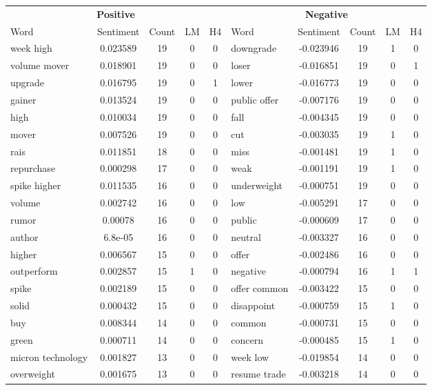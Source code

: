 \documentclass[ oneside,%
                    author={Joshua Felmeden},
                    degree={MEng},
                     title={Sentiment Analysis of Financial Headlines Based on Stock Returns},
                  subtitle={Research}]{dissertation}
\begin{document}
\begin{table}[!ht]
\centering
\begin{tabular}{lcccclcccc}
\multicolumn{5}{c}{\textbf{Positive}} & \multicolumn{5}{c}{\textbf{Negative}} \\
\cmidrule(lr){1-5}
\cmidrule(lr){6-10}
Word & Sentiment & Count & LM & H4 & Word & Sentiment & Count & LM & H4 \\
\cmidrule(lr){1-5}
\cmidrule(lr){6-10}
week high & 0.023589 & 19 & 0 & 0 & downgrade & -0.023946 & 19 & 1 & 0 \\
volume mover & 0.018901 & 19 & 0 & 0 & loser & -0.016851 & 19 & 0 & 1 \\
upgrade & 0.016795 & 19 & 0 & 1 & lower & -0.016773 & 19 & 0 & 0 \\
gainer & 0.013524 & 19 & 0 & 0 & public offer & -0.007176 & 19 & 0 & 0 \\
high & 0.010034 & 19 & 0 & 0 & fall & -0.004345 & 19 & 0 & 0 \\
mover & 0.007526 & 19 & 0 & 0 & cut & -0.003035 & 19 & 1 & 0 \\
rais & 0.011851 & 18 & 0 & 0 & miss & -0.001481 & 19 & 1 & 0 \\
repurchase & 0.000298 & 17 & 0 & 0 & weak & -0.001191 & 19 & 1 & 0 \\
spike higher & 0.011535 & 16 & 0 & 0 & underweight & -0.000751 & 19 & 0 & 0 \\
volume & 0.002742 & 16 & 0 & 0 & low & -0.005291 & 17 & 0 & 0 \\
rumor & 0.00078 & 16 & 0 & 0 & public & -0.000609 & 17 & 0 & 0 \\
author & 6.8e-05 & 16 & 0 & 0 & neutral & -0.003327 & 16 & 0 & 0 \\
higher & 0.006567 & 15 & 0 & 0 & offer & -0.002486 & 16 & 0 & 0 \\
outperform & 0.002857 & 15 & 1 & 0 & negative & -0.000794 & 16 & 1 & 1 \\
spike & 0.002189 & 15 & 0 & 0 & offer common & -0.003422 & 15 & 0 & 0 \\
solid & 0.000432 & 15 & 0 & 0 & disappoint & -0.000759 & 15 & 1 & 0 \\
buy & 0.008344 & 14 & 0 & 0 & common & -0.000731 & 15 & 0 & 0 \\
green & 0.000711 & 14 & 0 & 0 & concern & -0.000485 & 15 & 1 & 0 \\
micron technology & 0.001827 & 13 & 0 & 0 & week low & -0.019854 & 14 & 0 & 0 \\
overweight & 0.001675 & 13 & 0 & 0 & resume trade & -0.003218 & 14 & 0 & 0 \\

\end{tabular}
\end{table}
\end{document}
